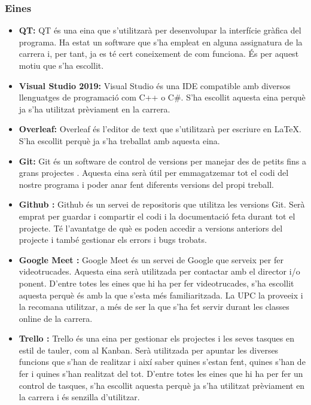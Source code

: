 \documentclass[a4paper]{article}
\begin{document}
\subsubsection{Eines}
\begin{itemize}
    \item \textbf{QT:} QT és una eina que s'utilitzarà per desenvolupar la interfície gràfica del programa. Ha estat un software que s'ha empleat en alguna assignatura de la carrera i, per tant, ja es té cert coneixement de com funciona. És per aquest motiu que s'ha escollit. 
    \item \textbf{Visual Studio 2019:} Visual Studio és una IDE compatible amb diversos llenguatges de programació com C++ o C\#. S'ha escollit aquesta eina perquè ja s'ha utilitzat prèviament en la carrera.  
    \item \textbf{Overleaf:} Overleaf és l'editor de text que s'utilitzarà per escriure en \LaTeX. S'ha escollit perquè ja s'ha treballat amb aquesta eina.
    \item \textbf{Git:} Git és un software de control de versions per manejar des de petits fins a grans projectes \cite{git}. Aquesta eina serà útil per emmagatzemar tot el codi del nostre programa i poder anar fent diferents versions del propi treball.
    \item \textbf{Github \cite{Github}:} Github és un servei de repositoris que utilitza les versions Git. Serà emprat per guardar i compartir el codi i la documentació feta durant tot el projecte. Té l'avantatge de què es poden accedir a versions anteriors del projecte i també gestionar els errors i bugs trobats. 
    \item \textbf{Google Meet \cite{GoogleMeet}:} Google Meet és un servei de Google que serveix per fer videotrucades. Aquesta eina serà utilitzada per contactar amb el director i/o ponent. D'entre totes les eines que hi ha per fer videotrucades, s'ha escollit aquesta perquè és amb la que s'esta més familiaritzada. La UPC la proveeix i la recomana utilitzar, a més de ser la que s'ha fet servir durant les classes online de la carrera.
    \item \textbf{Trello \cite{Trello}:} Trello és una eina per gestionar els projectes i les seves tasques en estil de tauler, com al Kanban. Serà utilitzada per apuntar les diverses funcions que s'han de realitzar i així saber quines s'estan fent, quines s'han de fer i quines s'han realitzat del tot. D'entre totes les eines que hi ha per fer un control de tasques, s'ha escollit aquesta perquè ja s'ha utilitzat prèviament en la carrera i és senzilla d'utilitzar.
\end{itemize}
\end{document}
